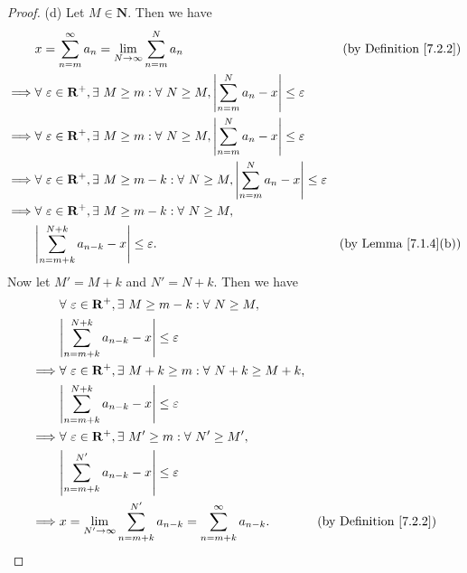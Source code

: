 \begin{proof}{(d)}
    Let \(M \in \mathbf{N}\).
    Then we have
    \begin{align*}
                 & x = \sum_{n = m}^\infty a_n = \lim_{N \to \infty} \sum_{n = m}^N a_n                                                             & \text{(by Definition \ref{7.2.2})} \\
        \implies & \forall\ \varepsilon \in \mathbf{R}^+, \exists\ M \geq m : \forall\ N \geq M, \abs*{\sum_{n = m}^N a_n - x} \leq \varepsilon                                          \\
        \implies & \forall\ \varepsilon \in \mathbf{R}^+, \exists\ M \geq m : \forall\ N \geq M, \abs*{\sum_{n = m}^N a_n - x} \leq \varepsilon                                          \\
        \implies & \forall\ \varepsilon \in \mathbf{R}^+, \exists\ M \geq m - k : \forall\ N \geq M, \abs*{\sum_{n = m}^N a_n - x} \leq \varepsilon                                      \\
        \implies & \forall\ \varepsilon \in \mathbf{R}^+, \exists\ M \geq m - k : \forall\ N \geq M,                                                                                     \\
                 & \abs*{\sum_{n = m + k}^{N + k} a_{n - k} - x} \leq \varepsilon.                                                                  & \text{(by Lemma \ref{7.1.4}(b))}
    \end{align*}
    Now let \(M' = M + k\) and \(N' = N + k\).
    Then we have
    \begin{align*}
                 & \forall\ \varepsilon \in \mathbf{R}^+, \exists\ M \geq m - k : \forall\ N \geq M,                                                  \\
                 & \abs*{\sum_{n = m + k}^{N + k} a_{n - k} - x} \leq \varepsilon                                                                     \\
        \implies & \forall\ \varepsilon \in \mathbf{R}^+, \exists\ M + k \geq m : \forall\ N + k \geq M + k,                                          \\
                 & \abs*{\sum_{n = m + k}^{N + k} a_{n - k} - x} \leq \varepsilon                                                                     \\
        \implies & \forall\ \varepsilon \in \mathbf{R}^+, \exists\ M' \geq m : \forall\ N' \geq M',                                                   \\
                 & \abs*{\sum_{n = m + k}^{N'} a_{n - k} - x} \leq \varepsilon                                                                        \\
        \implies & x = \lim_{N' \to \infty} \sum_{n = m + k}^{N'} a_{n - k} = \sum_{n = m + k}^\infty a_{n - k}. & \text{(by Definition \ref{7.2.2})}
    \end{align*}
\end{proof}

